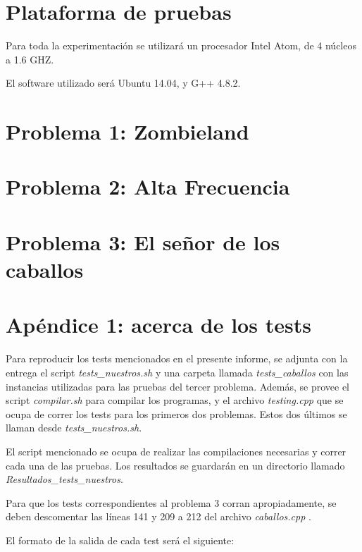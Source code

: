 \documentclass[a4paper]{article}
\begin{document}
\section{Plataforma de pruebas}

Para toda la experimentación se utilizará un procesador Intel Atom, de 4 núcleos a 1.6 GHZ.

El software utilizado será Ubuntu 14.04, y G++ 4.8.2.

\newpage
\section{Problema 1: Zombieland}


\newpage
\section{Problema 2: Alta Frecuencia}


\newpage
\section{Problema 3: El señor de los caballos}



\newpage
\section{Apéndice 1: acerca de los tests}

Para reproducir los tests mencionados en el presente informe, se adjunta con la entrega el script {\it tests_nuestros.sh} y una carpeta llamada {\it tests_caballos} con las instancias utilizadas para las pruebas del tercer problema.  Además, se provee el script {\it compilar.sh} para compilar los programas, y el archivo {\it testing.cpp} que se ocupa de correr los tests para los primeros dos problemas.  Estos dos últimos se llaman desde {\it tests_nuestros.sh}.

El script mencionado se ocupa de realizar las compilaciones necesarias y correr cada una de las pruebas. Los resultados se guardarán en un directorio llamado {\it Resultados_tests_nuestros}.

Para que los tests correspondientes al problema 3 corran apropiadamente, se deben descomentar las líneas 141 y 209 a 212 del archivo {\it caballos.cpp} .

El formato de la salida de cada test será el siguiente:
\end{document}
